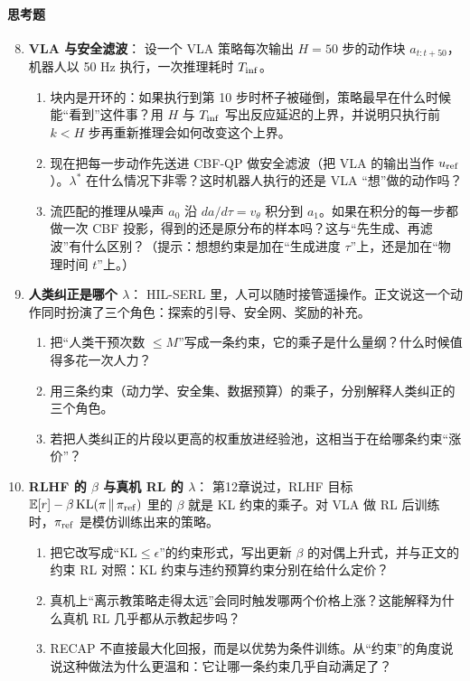 \paragraph{思考题}
\begin{enumerate}
    \setcounter{enumi}{7}
    \item \textbf{VLA 与安全滤波}：
    设一个 VLA 策略每次输出 $H = 50$ 步的动作块 $a_{t:t+50}$，机器人以 50 Hz 执行，一次推理耗时 $T_{\rm inf}$。
    \begin{enumerate}
        \item 块内是开环的：如果执行到第 10 步时杯子被碰倒，策略最早在什么时候能“看到”这件事？用 $H$ 与 $T_{\rm inf}$ 写出反应延迟的上界，并说明只执行前 $k < H$ 步再重新推理会如何改变这个上界。
        \item 现在把每一步动作先送进 CBF-QP 做安全滤波（把 VLA 的输出当作 $u_{\rm ref}$）。$\lambda^*$ 在什么情况下非零？这时机器人执行的还是 VLA “想”做的动作吗？
        \item 流匹配的推理从噪声 $a_0$ 沿 $da/d\tau = v_\theta$ 积分到 $a_1$。如果在积分的每一步都做一次 CBF 投影，得到的还是原分布的样本吗？这与“先生成、再滤波”有什么区别？（提示：想想约束是加在“生成进度 $\tau$”上，还是加在“物理时间 $t$”上。）
    \end{enumerate}

    \item \textbf{人类纠正是哪个 $\lambda$}：
    HIL-SERL 里，人可以随时接管遥操作。正文说这一个动作同时扮演了三个角色：探索的引导、安全网、奖励的补充。
    \begin{enumerate}
        \item 把“人类干预次数 $\le M$”写成一条约束，它的乘子是什么量纲？什么时候值得多花一次人力？
        \item 用三条约束（动力学、安全集、数据预算）的乘子，分别解释人类纠正的三个角色。
        \item 若把人类纠正的片段以更高的权重放进经验池，这相当于在给哪条约束“涨价”？
    \end{enumerate}

    \item \textbf{RLHF 的 $\beta$ 与真机 RL 的 $\lambda$}：
    第12章说过，RLHF 目标 $\mathbb{E}[r] - \beta\,\mathrm{KL}(\pi \,\|\, \pi_{\rm ref})$ 里的 $\beta$ 就是 KL 约束的乘子。对 VLA 做 RL 后训练时，$\pi_{\rm ref}$ 是模仿训练出来的策略。
    \begin{enumerate}
        \item 把它改写成“$\mathrm{KL} \le \epsilon$”的约束形式，写出更新 $\beta$ 的对偶上升式，并与正文的约束 RL 对照：KL 约束与违约预算约束分别在给什么定价？
        \item 真机上“离示教策略走得太远”会同时触发哪两个价格上涨？这能解释为什么真机 RL 几乎都从示教起步吗？
        \item RECAP 不直接最大化回报，而是以优势为条件训练。从“约束”的角度说说这种做法为什么更温和：它让哪一条约束几乎自动满足了？
    \end{enumerate}
\end{enumerate}

